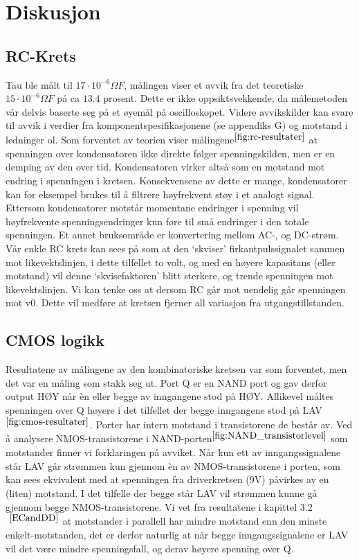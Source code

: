 \section{Diskusjon}

\subsection{RC-Krets}

    Tau ble målt til $17 \cdot 10^{-6} \Omega F$, målingen viser et avvik fra det teoretiske $15 \cdot 10^{-6} \Omega F$ på ca $13.4$ prosent.
    Dette er ikke oppsiktsvekkende, da målemetoden vår delvis baserte seg på et øyemål på oscilloskopet.
    Videre avvikskilder kan svare til avvik i verdier fra komponentspesifikasjonene (se appendiks G) og motstand i ledninger ol.
    Som forventet av teorien viser målingene$^{\ref{fig:rc-resultater}}$ at spenningen over kondensatoren ikke direkte følger spenningskilden, men er en demping av den over tid.
    Kondensatoren virker altså som en motstand mot endring i spenningen i kretsen.
    Konsekvensene av dette er mange, kondensatorer kan for eksempel brukes til å filtrere høyfrekvent støy i et analogt signal.
    Ettersom kondensatorer motstår momentane endringer i spenning vil høyfrekvente spenningsendringer kun føre til små endringer i den totale spenningen.
    Et annet bruksområde er konvertering mellom AC-, og DC-strøm.
    Vår enkle RC krets kan sees på som at den ‘skviser’ firkantpulssignalet sammen mot likevektslinjen, i dette tilfellet to volt, og med en høyere kapasitans (eller motstand) vil denne ‘skvisefaktoren’ blitt sterkere, og trende spenningen mot likevektslinjen.
    Vi kan tenke oss at dersom RC går mot uendelig går spenningen mot v0. Dette vil medføre at kretsen fjerner all variasjon fra utgangstillstanden.

\subsection{CMOS logikk}

    Resultatene av målingene av den kombinatoriske kretsen var som forventet, men det var en måling som stakk seg ut.
    Port Q er en NAND port og gav derfor output HØY når èn eller begge av inngangene stod på HØY.
    Allikevel måltes spenningen over Q høyere i det tilfellet der begge inngangene stod på LAV$^{\ref{fig:cmos-resultater}}$.
    Porter har intern motstand i transistorene de består av.
    Ved å analysere NMOS-transistorene i NAND-porten$^{\ref{fig:NAND_transistorlevel}}$ som motstander finner vi forklaringen på avviket.
    Når kun ett av inngangssignalene står LAV går strømmen kun gjennom èn av NMOS-transistorene i porten, som kan sees ekvivalent med at spenningen fra driverkretsen (9V) påvirkes av en (liten) motstand.
    I det tilfelle der begge står LAV vil strømmen kunne gå gjennom begge NMOS-transistorene.
    Vi vet fra resultatene i kapittel 3.2$^{~\ref{ECandDD}}$ at motstander i parallell har mindre motstand enn den minste enkelt-motstanden, det er derfor naturlig at når begge inngangssignalene er LAV vil det være mindre spenningsfall, og derav høyere spenning over Q.

